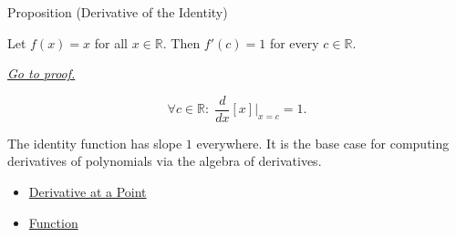 \begin{propositionbox}{Proposition (Derivative of the Identity)}
\begin{proposition}
\label{prop:derivative-of-the-identity}
Let $f(x) = x$ for all $x \in \mathbb{R}$. Then $f'(c) = 1$ for every $c \in \mathbb{R}$.

\smallskip\noindent
\hyperref[prf:derivative-of-the-identity]{\textit{Go to proof.}}
\end{proposition}
\end{propositionbox}

\begin{remark*}
\[
\forall c \in \mathbb{R}:\; \frac{d}{dx}[x]\big|_{x=c} = 1.
\]
\end{remark*}

\begin{remark*}[Interpretation]
The identity function has slope $1$ everywhere. It is the base case for computing derivatives of polynomials via the algebra of derivatives.
\end{remark*}

\begin{dependencies}
\begin{itemize}
  \item \hyperref[def:derivative-at-a-point]{Derivative at a Point}
  \item \hyperref[def:function]{Function}
\end{itemize}
\end{dependencies}
